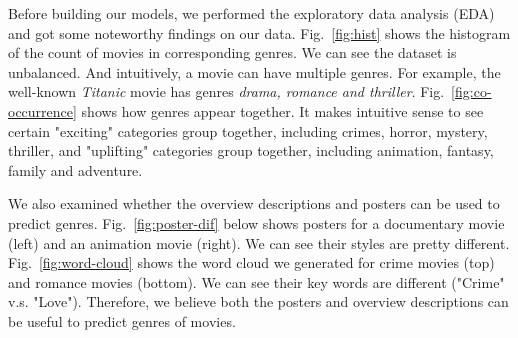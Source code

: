\documentclass[12pt]{article} %
\begin{document}
Before building our models, we performed the exploratory data analysis (EDA) and got some noteworthy findings on our data. Fig.~\ref{fig:hist} shows the histogram of the count of movies in corresponding genres. We can see the dataset is unbalanced. And intuitively, a movie can have multiple genres. For example, the well-known {\it Titanic} movie has genres {\it drama, romance and thriller}. Fig.~\ref{fig:co-occurrence} shows how genres appear together. It makes intuitive sense to see certain "exciting" categories group together, including crimes, horror, mystery, thriller, and "uplifting" categories group together, including animation, fantasy, family and adventure.

We also examined whether the overview descriptions and posters can be used to predict genres. Fig.~\ref{fig:poster-dif} below shows posters for a documentary movie (left) and an animation movie (right). We can see their styles are pretty different. Fig.~\ref{fig:word-cloud} shows the word cloud we generated for crime movies (top) and romance movies (bottom). We can see their key words are different ("Crime" v.s. "Love"). Therefore, we believe both the posters and overview descriptions can be useful to predict genres of movies.
\end{document}

